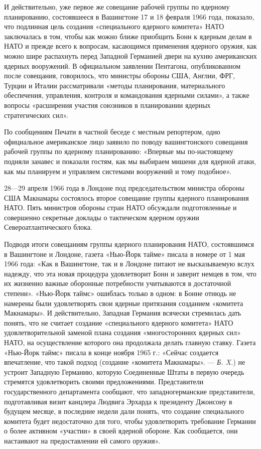 \documentclass[12pt, a4paper, openany]{book}
\begin{document}
	И действительно, уже первое же совещание рабочей группы по ядерному планированию, состоявшееся в Вашингтоне 17 и 18 февраля 1966 года, показало, что подлинная цель создания «специального ядерного комитета» НАТО заключалась в том, чтобы как можно ближе приобщить Бонн к ядерным делам в НАТО и прежде всего к вопросам, касающимся применения ядерного оружия, как можно шире распахнуть перед Западной Германией двери на кухню американских ядерных вооружений. В официальном заявлении Пентагона, опубликованном после совещания, говорилось, что министры обороны США, Англии, ФРГ, Турции и Италии рассматривали «методы планирования, материального обеспечения, управления, контроля и командования ядерными силами», а также вопросы «расширения участия союзников в планировании ядерных стратегических сил».
	
	По сообщениям Печати в частной беседе с местным репортером, одно официальное американское лицо заявило по поводу вашингтонского совещания рабочей группы по ядерному планированию: «Впервые мы по-настоящему подняли занавес и показали гостям, как мы выбираем мишени для ядерной атаки, как мы планируем и управляем системами вооружений и тому подобное».
	
	
	28—29 апреля 1966 года в Лондоне под председательством министра обороны США Макнамары состоялось второе совещание группы ядерного планирования НАТО. Пять министров обороны стран НАТО обсуждали подготовленные и совершенно секретные доклады о тактическом ядерном оружии Североатлантического блока.
	
	Подводя итоги совещаниям группы ядерного планирования НАТО, состоявшимся в Вашингтоне и Лондоне, газета «Нью-Йорк тайме» писала в номере от 1 мая 1966 года: «Как в Вашингтоне, так и в Лондоне питают не высказываемую вслух надежду, что эта новая процедура удовлетворит Бонн и заверит немцев в том, что их жизненно важные оборонные потребности учитываются в достаточной степени». «Нью-Йорк таймс» ошиблась только в одном: в Бонне отнюдь не намерены были удовлетворять свои ядерные притязания созданием «комитета Макнамары». И действительно, Западная Германия всячески стремилась дать понять, что не считает создание «специального ядерного комитета» НАТО удовлетворительной заменой плана создания «многосторонних ядерных сил» НАТО, на осуществление которого она продолжала делать главную ставку. Газета «Нью-Йорк таймс» писала в конце ноября 1965 г.: «Сейчас создается впечатление, что такой подход (создание «комитета Макнамары». — \textit{Б. X.}) не устроит Западную Германию, которую Соединенные Штаты в первую очередь стремятся удовлетворить своими предложениями. Представители государственного департамента сообщают, что западногерманские представители, подготавливая визит канцлера Людвига Эрхарда к президенту Джонсону в будущем месяце, в последние недели дали понять, что создание специального комитета будет недостаточно для того, чтобы удовлетворить требование Германии о более активном «участии» в своей ядерной обороне. Как сообщается, они настаивают на предоставлении ей самого оружия».
	
\end{document}
